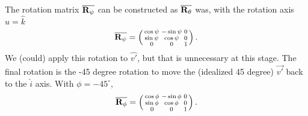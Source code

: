 \documentclass{article}
\def\matrix#1{\overline{\bf{#1}}}
\begin{document}
The rotation matrix $\matrix{R_\psi}$ can be constructed as $\matrix{R_\theta}$ was, with the rotation axis $\hat{u} = \hat{k}$
\begin{equation}
\matrix{R_\psi} = \begin{pmatrix}
\begin{smallmatrix}
	\cos\psi &  -\sin\psi & 0 \\
	\sin\psi & \cos\psi & 0 \\
	0 & 0 & 1
\end{smallmatrix}
\end{pmatrix}.
\end{equation}
We (could) apply this rotation to $\hat{v'}$, but that is unnecessary at this stage. The final rotation is the -45 degree rotation to move the (idealized 45 degree) $\vec{v'}$ back to the $\hat{i}$ axis. With $\phi=-45^\circ$,
\begin{equation}
\matrix{R_\phi} = \begin{pmatrix}
\begin{smallmatrix}
	\cos\phi &  -\sin\phi & 0 \\
	\sin\phi & \cos\phi & 0 \\
	0 & 0 & 1
\end{smallmatrix}
\end{pmatrix}.
\end{equation}
\end{document}
